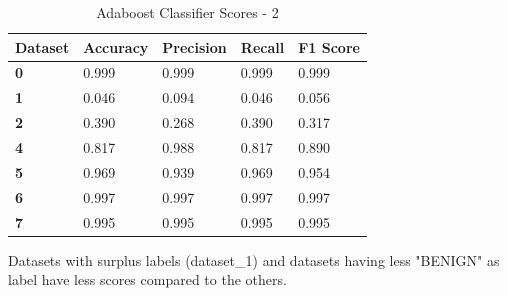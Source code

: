 \documentclass[submission,copyright,creativecommons]{eptcs}
\begin{document}
\begin{table}[H]
\begin{center}
\begin{tabular}{|l|l|l|l|l|}
\hline
\textbf{Dataset}  & \textbf{Accuracy} & \textbf{Precision} & \textbf{Recall} & \textbf{F1 Score} \\ \hline
\textbf{0} & 0.999             & 0.999              & 0.999           & 0.999             \\ \hline
\textbf{1} & 0.046             & 0.094              & 0.046           & 0.056             \\ \hline
\textbf{2} & 0.390             & 0.268              & 0.390           & 0.317             \\ \hline
\textbf{4} & 0.817             & 0.988              & 0.817           & 0.890             \\ \hline
\textbf{5} & 0.969             & 0.939              & 0.969           & 0.954             \\ \hline
\textbf{6} & 0.997             & 0.997              & 0.997           & 0.997             \\ \hline
\textbf{7} & 0.995             & 0.995              & 0.995           & 0.995             \\ \hline
\end{tabular}
\caption{Adaboost Classifier Scores - 2}
\label{tab:my-table}
\end{center}
\end{table}
Datasets with surplus labels (dataset\_1) and datasets having less "BENIGN" as label have less scores compared to the others.
\end{document}
